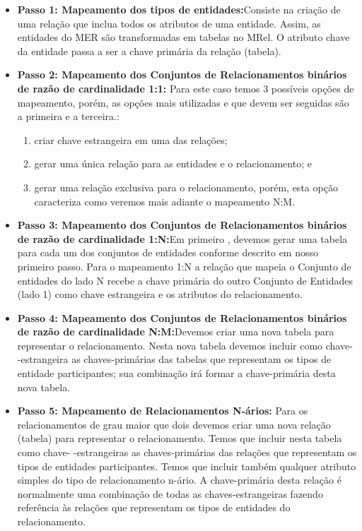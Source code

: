 \documentclass{article}
\begin{document}
\begin{itemize}
    \item \textbf{Passo 1: Mapeamento dos tipos de entidades:}Consiste na criação de uma relação que inclua todos os atributos de uma entidade. Assim, as entidades do MER são transformadas em tabelas no MRel. O atributo chave da entidade passa a ser a chave primária da relação (tabela).
    \item \textbf{Passo 2: Mapeamento dos Conjuntos de Relacionamentos binários de razão de cardinalidade 1:1:} Para este caso temos 3 possíveis opções de mapeamento, porém, as opções mais utilizadas e que devem ser seguidas são a primeira e a terceira.:
    \begin{enumerate}
        \item criar chave estrangeira em uma das relações;
        \item gerar uma única relação para as entidades e o relacionamento; e
        \item gerar uma relação exclusiva para o relacionamento, porém, esta opção caracteriza como veremos mais adiante o mapeamento N:M.
    \end{enumerate}
    \item \textbf{Passo 3: Mapeamento dos Conjuntos de Relacionamentos binários de razão de cardinalidade 1:N:}Em primeiro , devemos gerar uma tabela para cada um dos conjuntos de entidades conforme descrito em nosso primeiro passo. Para o mapeamento 1:N a relação que mapeia o Conjunto de entidades do lado N recebe a chave primária do outro Conjunto de Entidades (lado 1) como chave estrangeira e os atributos do relacionamento.
    \item \textbf{Passo 4: Mapeamento dos Conjuntos de Relacionamentos binários de razão de cardinalidade N:M:}Devemos criar uma nova tabela para representar o relacionamento. Nesta nova tabela devemos incluir como chave- -estrangeira as chaves-primárias das tabelas que representam os tipos de entidade participantes; sua combinação irá formar a chave-primária desta nova tabela.
    \item \textbf{Passo 5: Mapeamento de Relacionamentos N-ários:} Para os relacionamentos de grau maior que dois devemos criar uma nova relação (tabela) para representar o relacionamento. Temos que incluir nesta tabela como chave- -estrangeiras as chaves-primárias das relações que representam os tipos de entidades participantes. Temos que incluir também qualquer atributo simples do tipo de relacionamento n-ário. A chave-primária desta relação é normalmente uma combinação de todas as chaves-estrangeiras fazendo referência às relações que representam os tipos de entidades do relacionamento.
\end{itemize}
\end{document}
